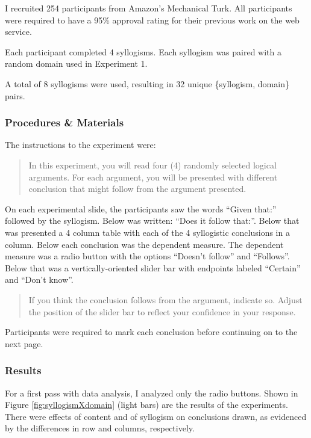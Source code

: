 \documentclass{article} %
\begin{document}
I recruited 254 participants from Amazon's Mechanical Turk. All participants were required to have a 95\% approval rating for their previous work on the web service. 

Each participant completed 4 syllogisms. Each syllogism was paired with a random domain used in Experiment 1.

A total of 8 syllogisms were used, resulting in 32 unique \{syllogism, domain\} pairs.

\subsubsection{Procedures \& Materials}

The instructions to the experiment were:

\begin{quotation}
In this experiment, you will read four (4) randomly selected logical arguments. For each argument, you will be presented with different conclusion that might follow from the argument presented.
\end{quotation}

On each experimental slide, the participants saw the words ``Given that:'' followed by the syllogism. Below was written: ``Does it follow that:''. Below that was presented a 4 column table with each of the 4 syllogistic conclusions in a column. Below each conclusion was the dependent measure. The dependent measure was a radio button with the options ``Doesn't follow'' and ``Follows''. Below that was a vertically-oriented slider bar with endpoints labeled ``Certain'' and ``Don't know''. 

\begin{quotation}
If you think the conclusion follows from the argument, indicate so. Adjust the position of the slider bar to reflect your confidence in your response.
\end{quotation}

Participants were required to mark each conclusion before continuing on to the next page.

\subsubsection{Results}

For a first pass with data analysis, I analyzed only the radio buttons. Shown in Figure \ref{fig:syllogismXdomain} (light bars) are the results of the experiments. There were effects of content and of syllogism on conclusions drawn, as evidenced by the differences in row and columns, respectively.
\end{document}
